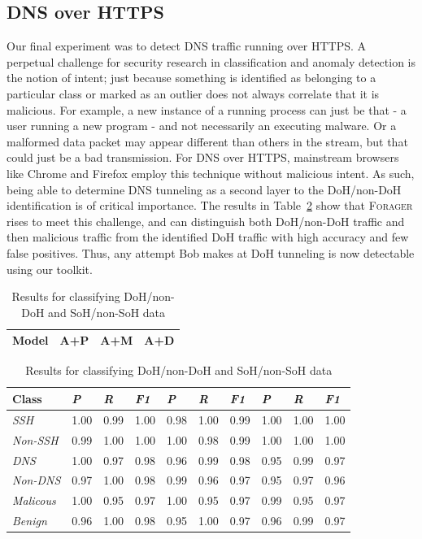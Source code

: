 \subsection{DNS over HTTPS}
Our final experiment was to detect DNS traffic running over HTTPS. A perpetual challenge for security research in classification and anomaly detection is the notion of intent; just because something is identified as belonging to a particular class or marked as an outlier does not always correlate that it is malicious. For example, a new instance of a running process can just be that - a user running a new program - and not necessarily an executing malware. Or a malformed data packet may appear different than others in the stream, but that could just be a bad transmission. For DNS over HTTPS, mainstream browsers like Chrome and Firefox employ this technique without malicious intent. As such, being able to determine DNS tunneling as a second layer to the DoH/non-DoH identification is of critical importance.
 The results in Table~\ref{tab:dohsohresults} show that \textsc{Forager} rises to meet this challenge, and can distinguish both DoH/non-DoH traffic and then malicious traffic from the identified DoH traffic with high accuracy and few false positives. Thus, any attempt Bob makes at DoH tunneling is now detectable using our toolkit.

\begin{table} [ht!]
\centering
\begin{tabular} {|p{2.5cm}|p{2.5cm}|p{2.5cm}|p{2.5cm}|}
\hline
\textbf{Model} & A+P & A+M & A+D \\
\hline
\end{tabular}
\begin{tabular} {|p{2cm}|p{0.6cm}p{0.6cm}p{0.6cm}|p{0.6cm}p{0.6cm}p{0.6cm}|p{0.6cm}p{0.6cm}p{0.6cm}|}
\hline
\textbf{Class} & \textit{P} & \textit{R} & \textit{F1} & \textit{P} & \textit{R} & \textit{F1} & \textit{P} & \textit{R} & \textit{F1} \\
\hline
\hline
\textit{SSH} & 1.00 & 0.99 & 1.00 & 0.98 & 1.00 & 0.99 & 1.00 & 1.00 & 1.00 \\
\textit{Non-SSH} & 0.99 & 1.00 & 1.00 & 1.00 & 0.98 & 0.99 & 1.00 & 1.00 & 1.00 \\
\hline
\hline
\textit{DNS} & 1.00 & 0.97 & 0.98 & 0.96 & 0.99 & 0.98 & 0.95 & 0.99 & 0.97 \\
\textit{Non-DNS} & 0.97 & 1.00 & 0.98 & 0.99 & 0.96 & 0.97 & 0.95 & 0.97 & 0.96 \\
\hline
\hline
\textit{Malicous} & 1.00 & 0.95 & 0.97 & 1.00 & 0.95 & 0.97 & 0.99 & 0.95 & 0.97 \\
\textit{Benign} & 0.96 & 1.00 & 0.98 & 0.95 & 1.00 & 0.97 & 0.96 & 0.99 & 0.97 \\
\hline
\end{tabular}
\caption{Results for classifying DoH/non-DoH and SoH/non-SoH data}
\label{tab:dohsohresults}
\end{table}

